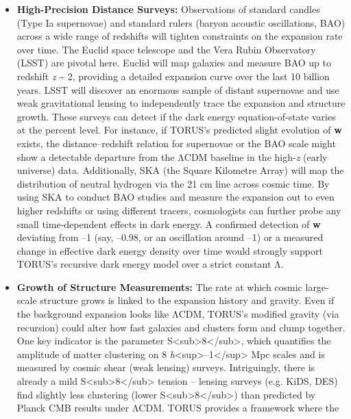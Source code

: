\documentclass[
]{article}
\begin{document}
\begin{itemize}
\item
  \textbf{High-Precision Distance Surveys:} Observations of standard
  candles (Type Ia supernovae) and standard rulers (baryon acoustic
  oscillations, BAO) across a wide range of redshifts will tighten
  constraints on the expansion rate over time. The Euclid space
  telescope and the Vera Rubin Observatory (LSST) are pivotal here.
  Euclid will map galaxies and measure BAO up to redshift \emph{z}
  \textasciitilde{} 2, providing a detailed expansion curve over the
  last 10 billion years. LSST will discover an enormous sample of
  distant supernovae and use weak gravitational lensing to independently
  trace the expansion and structure growth. These surveys can detect if
  the dark energy equation-of-state varies at the percent level. For
  instance, if TORUS's predicted slight evolution of \textbf{w} exists,
  the distance--redshift relation for supernovae or the BAO scale might
  show a detectable departure from the ΛCDM baseline in the
  high-\emph{z} (early universe) data. Additionally, SKA (the Square
  Kilometre Array) will map the distribution of neutral hydrogen via the
  21 cm line across cosmic time. By using SKA to conduct BAO studies and
  measure the expansion out to even higher redshifts or using different
  tracers, cosmologists can further probe any small time-dependent
  effects in dark energy. A confirmed detection of \textbf{w} deviating
  from --1 (say, --0.98, or an oscillation around --1) or a measured
  change in effective dark energy density over time would strongly
  support TORUS's recursive dark energy model over a strict constant Λ.
\item
  \textbf{Growth of Structure Measurements:} The rate at which cosmic
  large-scale structure grows is linked to the expansion history and
  gravity. Even if the background expansion looks like ΛCDM, TORUS's
  modified gravity (via recursion) could alter how fast galaxies and
  clusters form and clump together. One key indicator is the parameter
  S\textless sub\textgreater8\textless/sub\textgreater, which quantifies
  the amplitude of matter clustering on 8
  \emph{h}\textless sup\textgreater--1\textless/sup\textgreater{} Mpc
  scales and is measured by cosmic shear (weak lensing) surveys.
  Intriguingly, there is already a mild
  S\textless sub\textgreater8\textless/sub\textgreater{} tension --
  lensing surveys (e.g. KiDS, DES) find slightly less clustering (lower
  S\textless sub\textgreater8\textless/sub\textgreater) than predicted
  by Planck CMB results under ΛCDM. TORUS provides a framework where the

\end{itemize}
\end{document}
